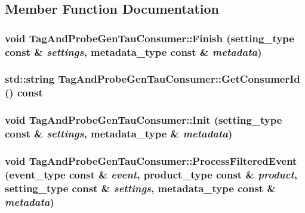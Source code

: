 \subsection{Member Function Documentation}
\hypertarget{classTagAndProbeGenTauConsumer_a5d28789e202ecd55cd3dc6b629df0b56}{
\subsubsection[{Finish}]{\setlength{\rightskip}{0pt plus 5cm}void TagAndProbeGenTauConsumer::Finish (setting\_\-type const \& {\em settings}, \/  metadata\_\-type const \& {\em metadata})}}
\label{classTagAndProbeGenTauConsumer_a5d28789e202ecd55cd3dc6b629df0b56}
\hypertarget{classTagAndProbeGenTauConsumer_ab998d37ebef06d04de51b3983c9fdade}{
\subsubsection[{GetConsumerId}]{\setlength{\rightskip}{0pt plus 5cm}std::string TagAndProbeGenTauConsumer::GetConsumerId () const}}
\label{classTagAndProbeGenTauConsumer_ab998d37ebef06d04de51b3983c9fdade}
\hypertarget{classTagAndProbeGenTauConsumer_a59e9e2c69ab950447e1341d3ad742625}{
\subsubsection[{Init}]{\setlength{\rightskip}{0pt plus 5cm}void TagAndProbeGenTauConsumer::Init (setting\_\-type const \& {\em settings}, \/  metadata\_\-type \& {\em metadata})}}
\label{classTagAndProbeGenTauConsumer_a59e9e2c69ab950447e1341d3ad742625}
\hypertarget{classTagAndProbeGenTauConsumer_a9d59f5ddc93e5c198178278460facc7f}{
\subsubsection[{ProcessFilteredEvent}]{\setlength{\rightskip}{0pt plus 5cm}void TagAndProbeGenTauConsumer::ProcessFilteredEvent (event\_\-type const \& {\em event}, \/  product\_\-type const \& {\em product}, \/  setting\_\-type const \& {\em settings}, \/  metadata\_\-type const \& {\em metadata})}}
\label{classTagAndProbeGenTauConsumer_a9d59f5ddc93e5c198178278460facc7f}


